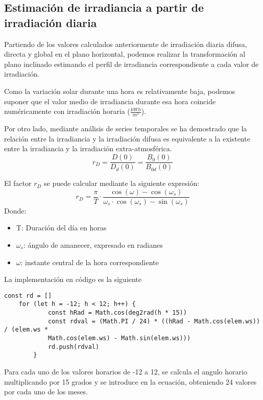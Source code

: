 \subsection{Estimación de irradiancia a partir de irradiación diaria}
Partiendo de los valores calculados anteriormente de irradiación diaria difusa, directa y global en el plano horizontal, podemos realizar la transformación al plano inclinado estimando el perfil de irradiancia correspondiente a cada valor de irradiación.

Como la variación solar durante una hora es relativamente baja, podemos suponer que el valor medio de irradiancia durante esa hora coincide numéricamente con irradiación horaria ($ \frac{kWh}{m^2}$).

Por otro lado, mediante análisis de series temporales se ha demostrado que la relación entre la irradiancia y la irradiación difusa es equivalente a la existente entre la irradiancia y la irradiación extra-atmosférica.
\begin{equation}
	r_D = \frac{D(0)}{D_d(0)} = \frac{B_0(0)}{B_{0d}(0)	}
\end{equation}

El factor $r_D$  se puede calcular mediante la siguiente expresión:
\begin{equation}
r_D = \frac{\pi}{T}\cdot\frac{\cos(\omega)-\cos(\omega_s)}{\omega_s\cdot\cos(\omega_s)-\sin(\omega_s)}
\end{equation}
Donde:
\begin{itemize}
\item T: Duración del día en horas
\item $\omega_s$: ángulo de amanecer, expresado en radianes
\item $\omega$: instante central de la hora correspondiente
\end{itemize}

La implementación en código es la siguiente

\begin{lstlisting}[style=ES6, caption={Cálculo de rD}]
	const rd = []
	for (let h = -12; h < 12; h++) {
			const hRad = Math.cos(deg2rad(h * 15))
			const rdval = (Math.PI / 24) * ((hRad - Math.cos(elem.ws)) / (elem.ws * 
			Math.cos(elem.ws) - Math.sin(elem.ws)))
			rd.push(rdval)
		}
\end{lstlisting}

Para cada uno de los valores horarios de -12 a 12, se calcula el angulo horario multiplicando por 15 grados y se introduce en la ecuación, obteniendo 24 valores por cada uno de los meses.

